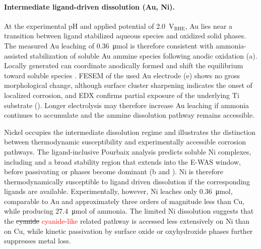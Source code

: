 \documentclass[twoside,twocolumn,9pt]{article}
\begin{document}
\paragraph{Intermediate ligand-driven dissolution (Au, Ni).}
At the experimental pH and applied potential of 2.0~V$_{\mathrm{RHE}}$, Au lies near a transition between ligand stabilized aqueous species and oxidized solid phases. The measured Au leaching of 0.36~\si{\micro mol} is therefore consistent with ammonia-assisted stabilization of soluble Au ammine species following anodic oxidation (a). Locally generated  can coordinate anodically formed  and shift the equilibrium toward soluble  species \cite{Armunanto2004}. FESEM of the used Au electrode (e) shows no gross morphological change, although surface cluster sharpening indicates the onset of localized corrosion, and EDX confirms partial exposure of the underlying Ti substrate (). Longer electrolysis may therefore increase Au leaching if ammonia continues to accumulate and the ammine dissolution pathway remains accessible.

Nickel occupies the intermediate dissolution regime and illustrates the distinction between thermodynamic susceptibility and experimentally accessible corrosion pathways. The ligand-inclusive Pourbaix analysis predicts soluble Ni complexes, including  and a broad  stability region that extends into the E-WAS window, before passivating  or  phases become dominant (b and ). Ni is therefore thermodynamically susceptible to ligand driven dissolution if the corresponding ligands are available. Experimentally, however, Ni leaches only 0.36~\si{\micro mol}, comparable to Au and approximately three orders of magnitude less than Cu, while producing 27.4~\si{\micro mol} of ammonia. The limited Ni dissolution suggests that the \sout{cyanide} \textcolor{red}{cyanide-like} related pathway is accessed less extensively on Ni than on Cu, while kinetic passivation by surface oxide or oxyhydroxide phases further suppresses metal loss.

\end{document}
